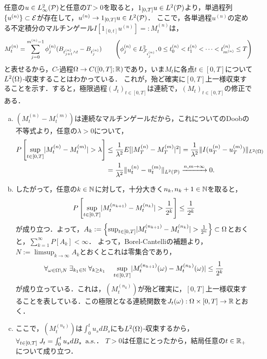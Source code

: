 \documentclass[uplatex,dvipdfmx]{jsreport}
\begin{document}
\begin{Proof}
    任意の$u\in L^2_\infty(\P)$と任意の$T>0$を取ると，$1_{[0,T]}u\in L^2(\P)$より，単過程列$\{u^{(n)}\}\subset\E$が存在して，$u^{(n)}\to 1_{[0,T]}u\in L^2(\P)$．
    ここで，各単過程$u^{(n)}$の定める不定積分のマルチンゲール$I[1_{[0,t]}u^{(n)}]=:M_t^{(n)}$は，
    \[M^{(n)}_t=\sum_{j=0}^{m^{(n)}-1}\phi_j^{(n)}(B_{t_{j+1}^{(n)}\land t}-B_{t_j^{(n)}})\qquad\paren{\phi_j^{(n)}\in L^2_{\F_{t_j^{(n)}}},0\le t_0^{(n)}<t_1^{(n)}<\cdots<t_{m^{(n)}}^{(n)}\le T}\]
    と表せるから，$C$-過程$\Om\to C([0,T];\R)$であり，いま$M_t$に各点$t\in[0,T]$について$L^2(\Om)$-収束することはわかっている．
    これが，殆ど確実に$[0,T]$上一様収束することを示す．すると，極限過程$(J_t)_{t\in[0,T]}$は連続で，$(M_t)_{t\in[0,T]}$の修正である．
    \begin{enumerate}[(a)]
        \item $(M_t^{(n)}-M_t^{(m)})$は連続なマルチンゲールだから，これについてのDoobの不等式より，任意の$\lambda>0$について，
        \begin{align*}
            P\Square{\sup_{t\in[0,T]}\abs{M_t^{(n)}-M_t^{(m)}}>\lambda}&\le\frac{1}{\lambda^2}E[\abs{M^{(n)}_T-M^{(m)}_T}^2]=\frac{1}{\lambda^2}\norm{I(u^{(n)}_T-u^{(m)}_T)}_{L^2(\Om)}\\
            &=\frac{1}{\lambda^2}\norm{u^{(n)}_t-u^{(m)}_t}_{L^2(\P)}\xrightarrow{n,m\to\infty}0.
        \end{align*}
        \item したがって，任意の$k\in\N$に対して，十分大きく$n_k,n_k+1\in\N$を取ると，
        \[P\Square{\sup_{t\in[0,T]}\abs{M_t^{(n_{k+1})}-M_t^{(n_k)}}>\frac{1}{2^k}}\le\frac{1}{2^k}\]
        が成り立つ．よって，$A_k:=\Brace{\sup_{t\in[0,T]}\abs{M_t^{(n_{k+1})}-M_t^{(n_k)}}>\frac{1}{2^n}}\subset\Om$とおくと，$\sum^\infty_{k=1}P[A_k]<\infty$．
        よって，Borel-Cantelliの補題より，$N:=\limsup_{k\to\infty}A_k$とおくとこれは零集合であり，
        \[\forall_{\om\in\Om\setminus N}\;\exists_{k_1\in\N}\;\forall_{k\ge k_1}\quad\sup_{t\in[0,T]}\abs{M_t^{(n_{k+1})}(\om)-M_t^{(n_k)}(\om)}\le\frac{1}{2^k}\]
        が成り立っている．これは，$(M_t^{(n_k)})$が殆ど確実に，$[0,T]$上一様収束することを表している．この極限となる連続関数を$J_t(\om):\Om\times[0,T]\to\R$とおく．
        \item ここで，$(M_t^{(n_k)})$は$\int^t_0u_sdB_s$にも$L^2(\Om)$-収束するから，$\forall_{t\in[0,T]}\;J_t=\int^t_0u_sdB_s\;\as$．
        $T>0$は任意にとったから，結局任意の$t\in\R_+$について成り立つ．
    \end{enumerate}
\end{Proof}
\end{document}

